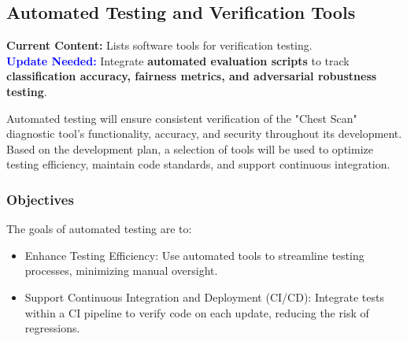 \documentclass[12pt, titlepage]{article}
\begin{document}
\subsection{Automated Testing and Verification Tools}

\textbf{Current Content:} Lists software tools for verification testing. \\
\textbf{\textcolor{blue}{Update Needed:}} Integrate \textbf{automated evaluation scripts} to track \textbf{classification accuracy, fairness metrics, and adversarial robustness testing}.

Automated testing will ensure consistent verification of the "Chest Scan" diagnostic tool’s functionality, accuracy, and security throughout its development. Based on the development plan, a selection of tools will be used to optimize testing efficiency, maintain code standards, and support continuous integration.

\subsubsection{Objectives}
The goals of automated testing are to:
\begin{itemize}
  \item Enhance Testing Efficiency: Use automated tools to streamline testing processes, minimizing manual oversight.
  \item Support Continuous Integration and Deployment (CI/CD): Integrate tests within a CI pipeline to verify code on each update, reducing the risk of regressions.
\end{itemize}
\end{document}
